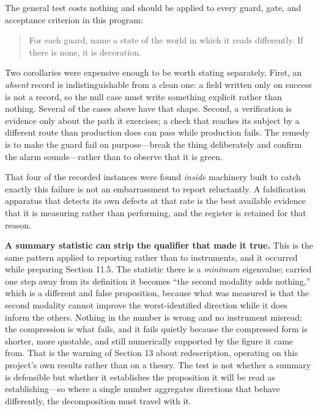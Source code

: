 The general test costs nothing and should be applied to every guard, gate, and
acceptance criterion in this program:

\begin{quote}
For each guard, name a state of the world in which it reads differently. If
there is none, it is decoration.
\end{quote}

Two corollaries were expensive enough to be worth stating separately. First, an
\emph{absent} record is indistinguishable from a clean one: a field written only
on success is not a record, so the null case must write something explicit
rather than nothing. Several of the cases above have that shape. Second, a
verification is evidence only about the path it exercises; a check that reaches
its subject by a different route than production does can pass while production
fails. The remedy is to make the guard fail on purpose---break the thing
deliberately and confirm the alarm sounds---rather than to observe that it is
green.

That four of the recorded instances were found \emph{inside} machinery built to
catch exactly this failure is not an embarrassment to report reluctantly. A
falsification apparatus that detects its own defects at that rate is the best
available evidence that it is measuring rather than performing, and the register
is retained for that reason.

\textbf{A summary statistic can strip the qualifier that made it true.} This is
the same pattern applied to reporting rather than to instruments, and it
occurred while preparing Section 11.5. The statistic there is a \emph{minimum}
eigenvalue; carried one step away from its definition it becomes ``the second
modality adds nothing,'' which is a different and false proposition, because
what was measured is that the second modality cannot improve the
worst-identified direction while it does inform the others. Nothing in the
number is wrong and no instrument misread; the compression is what fails, and it
fails quietly because the compressed form is shorter, more quotable, and still
numerically supported by the figure it came from. That is the warning of Section
13 about redescription, operating on this project's own results rather than on a
theory. The test is not whether a summary is defensible but whether it
establishes the proposition it will be read as establishing---so where a single
number aggregates directions that behave differently, the decomposition must
travel with it.

